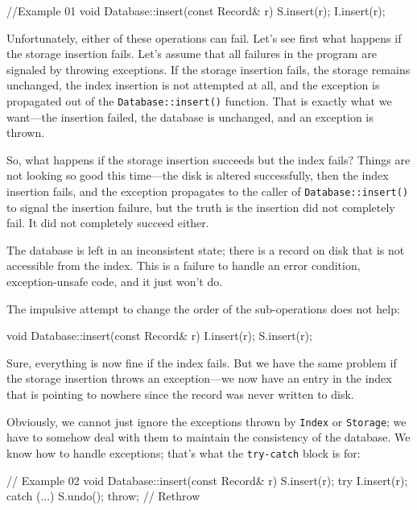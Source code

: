\begin{code}
//Example 01
void Database::insert(const Record& r) {
  S.insert(r);
  I.insert(r);
}
\end{code}

Unfortunately, either of these operations can fail. Let's see first what happens if the storage insertion fails. Let's assume that all failures in the program are signaled by throwing exceptions. If the storage insertion fails, the storage remains unchanged, the index insertion is not attempted at all, and the exception is propagated out of the \texttt{Database::insert()} function. That is exactly what we want---the insertion failed, the database is unchanged, and an exception is thrown.

So, what happens if the storage insertion succeeds but the index fails? Things are not looking so good this time---the disk is altered successfully, then the index insertion fails, and the exception propagates to the caller of \texttt{Database::insert()} to signal the insertion failure, but the truth is the insertion did not completely fail. It did not completely succeed either.

The database is left in an inconsistent state; there is a record on disk that is not accessible from the index. This is a failure to handle an error condition, exception-unsafe code, and it just won't do.

The impulsive attempt to change the order of the sub-operations does not help:

\begin{code}
void Database::insert(const Record& r) {
  I.insert(r);
  S.insert(r);
}
\end{code}

Sure, everything is now fine if the index fails. But we have the same problem if the storage insertion throws an exception---we now have an entry in the index that is pointing to nowhere since the record was never written to disk.

Obviously, we cannot just ignore the exceptions thrown by \texttt{Index} or \texttt{Storage}; we have to somehow deal with them to maintain the consistency of the database. We know how to handle exceptions; that's what the \texttt{try-catch} block is for:

\begin{code}
// Example 02
void Database::insert(const Record& r) {
  S.insert(r);
  try {
    I.insert(r);
  } catch (...) {
    S.undo();
    throw;    // Rethrow
  }
}
\end{code}


